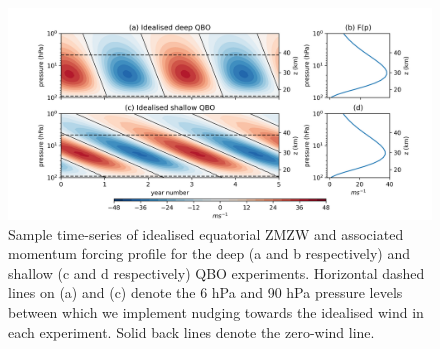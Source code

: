 \begin{figure}[h!]
\begin{center}
\noindent\includegraphics[width = \linewidth]{Figures/Figures-deepQBO/Idealised_QBO_features.png}
\caption[Idealised QBO winds used for nudging experiments]{Sample time-series of idealised equatorial ZMZW and associated momentum forcing profile for the deep (a and b respectively) and shallow (c and d respectively) QBO experiments. Horizontal dashed lines on (a) and (c) denote the 6 hPa and 90 hPa pressure levels between which we implement nudging towards the idealised wind in each experiment. Solid back lines denote the zero-wind line.}
\label{fig:Idealised_QBO_samples}
\end{center}
\end{figure}


